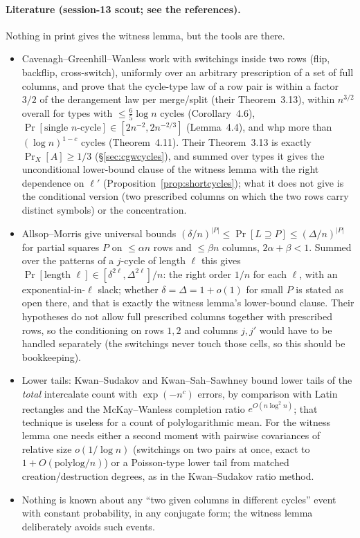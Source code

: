 \paragraph{Literature (session-13 scout; see the references).}  Nothing
in print gives the witness lemma, but the tools are there.
\begin{itemize}[leftmargin=2em]
\item Cavenagh--Greenhill--Wanless \cite{CGW08} work with switchings
inside two rows (flip, backflip, cross-switch), uniformly over an
arbitrary prescription of a set of full columns, and prove that the
cycle-type law of a row pair is within a factor $3/2$ of the
derangement law per merge/split (their Theorem~3.13), within $n^{3/2}$
overall for types with $\le\frac65\log n$ cycles (Corollary~4.6),
$\Pr[\text{single $n$-cycle}]\in[2n^{-2},2n^{-2/3}]$ (Lemma~4.4), and
whp more than $(\log n)^{1-c}$ cycles (Theorem~4.11).  Their
Theorem~3.13 is exactly $\Pr_X[A]\ge1/3$ (\S\ref{sec:cgwcycles}), and
summed over types it gives the unconditional lower-bound clause of the
witness lemma with the right dependence on $\ell'$
(Proposition~\ref{prop:shortcycles}); what it does not give is the
conditional version (two prescribed columns on which the two rows
carry distinct symbols) or the concentration.
\item Allsop--Morris \cite{AM26} give universal bounds
$(\delta/n)^{|P|}\le\Pr[L\supseteq P]\le(\Delta/n)^{|P|}$ for partial
squares $P$ on $\le\alpha n$ rows and $\le\beta n$ columns, $2\alpha+\beta<1$.
Summed over the patterns of a $j$-cycle of length $\ell$ this gives
$\Pr[\text{length }\ell]\in[\delta^{2\ell},\Delta^{2\ell}]/n$: the
right order $1/n$ for each $\ell$, with an exponential-in-$\ell$ slack;
whether $\delta=\Delta=1+o(1)$ for small $P$ is stated as open there,
and that is exactly the witness lemma's lower-bound clause.  Their
hypotheses do not allow full prescribed columns together with
prescribed rows, so the conditioning on rows $1,2$ and columns $j,j'$
would have to be handled separately (the switchings never touch those
cells, so this should be bookkeeping).
\item Lower tails: Kwan--Sudakov and Kwan--Sah--Sawhney bound lower
tails of the \emph{total} intercalate count with $\exp(-n^{c})$ errors,
by comparison with Latin rectangles and the McKay--Wanless completion
ratio $e^{O(n\log^2n)}$; that technique is useless for a count of
polylogarithmic mean.  For the witness lemma one needs either a second
moment with pairwise covariances of relative size $o(1/\log n)$
(switchings on two pairs at once, exact to $1+O(\mathrm{polylog}/n)$)
or a Poisson-type lower tail from matched creation/destruction
degrees, as in the Kwan--Sudakov ratio method.
\item Nothing is known about any ``two given columns in different
cycles'' event with constant probability, in any conjugate form; the
witness lemma deliberately avoids such events.
\end{itemize}

